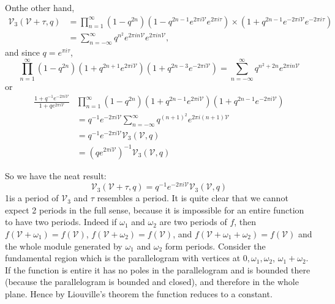 On\pageoriginale the other hand,
\begin{align*}
  \mathscr{V}_3 (\mathscr{V}+\tau, q) & = \prod^\infty_{n=1}
  (1- q^{2n})(1-q^{2n-1}e^{2 \pi i \mathscr{V}} e^{2 \pi i \tau})\times (1+
  q^{2n-1} e^{-2 \pi i \mathscr{V}} e^{-2\pi i \tau})\\
  & = \sum^\infty_{n=-\infty} q^{n^2} e^{2 \pi i n \mathscr{V}} e^{2
    \pi i n \mathscr{V}},
\end{align*}
and since $q=e^{\pi i \tau}$,
$$
\prod^\infty_{n=1} (1-q^{2n}) (1+ q^{2n+1}e^{2 \pi i \mathscr{V}}) (1+
q^{2n-3}e^{-2\pi i \mathscr{V}}) = \sum^\infty_{n=- \infty} q^{n^2+
  2n} e^{2 \pi i n \mathscr{V}}
$$
or 
\begin{align*}
  \frac{1+q^{-1} e^{-2 \pi i \mathscr{V}}}{1+q e^{2 \pi i
      \mathscr{V}}} & \prod^\infty_{n=1} (1-q^{2n})(1+ q^{2n-1}e^{2 \pi i
    \mathscr{V}})(1+q^{2n-1} e^{-2\pi i \mathscr{V}})\\
  & = q^{-1} e^{-2 \pi i \mathscr{V}} \sum^\infty_{n=-\infty}
  q^{(n+1)^2} e^{2 \pi i (n+1)\mathscr{V}}\\
  & = q^{-1} e^{-2 \pi i \mathscr{V}} \mathscr{V}_3(\mathscr{V}, q)\\
  & = (q e^{2\pi i \mathscr{V}})^{-1} \mathscr{V}_3 (\mathscr{V}, q)
\end{align*}

So we have the neat result:
$$
\mathscr{V}_3 (\mathscr{V}+ \tau, q)= q^{-1} e^{-2 \pi i \mathscr{V}}
\mathscr{V}_3 (\mathscr{V}, q)
$$
1\pageoriginale is a period of $\mathscr{V}_3$ and $\tau$ resembles a period. It is
quite clear that we cannot expect 2 periods in the full sense, because
it is impossible for an entire function to have two periods. Indeed if
$\omega_1$ and $\omega_2$ are two periods of $f$, then $f(\mathscr{V}+
\omega_1) =f(\mathscr{V})$, $f(\mathscr{V}+ \omega_2)=
f(\mathscr{V})$, and $f(\mathscr{V}+ \omega_1+ \omega_2)=
f(\mathscr{V})$ and the whole module generated by $\omega_1$ and
$\omega_2$ form periods. Consider the fundamental region which is the
parallelogram with vertices at $0, \omega_1, \omega_2$, $\omega_1+
\omega_2$. If the function is entire it has no poles in the
parallelogram and is bounded there (because the parallelogram is
bounded and closed), and therefore in the whole plane. Hence by
Liouville's theorem the function reduces to a constant.

